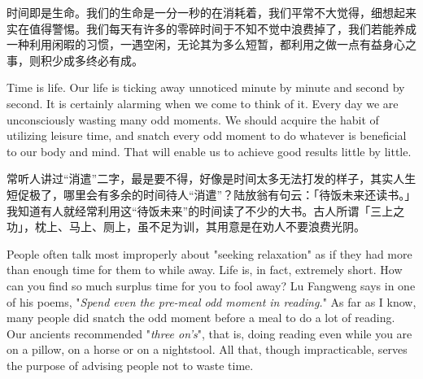 {%
% 
 
 时间即是生命。我们的生命是一分一秒的在消耗着，我们平常不大觉得，细想起来实在值得警惕。我们每天有许多的零碎时间于不知不觉中浪费掉了，我们若能养成一种利用闲暇的习惯，一遇空闲，无论其为多么短暂，都利用之做一点有益身心之事，则积少成多终必有成。
 
 Time is life. Our life is ticking away unnoticed minute by minute and second by second. It is certainly alarming when we come to think of it. Every day we are unconsciously wasting many odd moments. We should acquire the habit of utilizing leisure time, and snatch every odd moment to do whatever is beneficial to our body and mind. That will enable us to achieve good results little by little. 
 
 常听人讲过“消遣”二字，最是要不得，好像是时间太多无法打发的样子，其实人生短促极了，哪里会有多余的时间待人“消遣”？陆放翁有句云：「待饭未来还读书。」我知道有人就经常利用这“待饭未来”的时间读了不少的大书。古人所谓「三上之功」，枕上、马上、厕上，虽不足为训，其用意是在劝人不要浪费光阴。
 
 People often talk most improperly about "seeking relaxation" as if they had more than enough time for them to while away. Life is, in fact, extremely short. How can you find so much surplus time for you to fool away? Lu Fangweng says in one of his poems, "\textit{Spend even the pre-meal odd moment in reading.}" As far as I know, many people did snatch the odd moment before a meal to do a lot of reading. Our ancients recommended "\textit{three on's}", that is, doing reading even while you are on a pillow, on a horse or on a nightstool. All that, though impracticable, serves the purpose of advising people not to waste time.
 
}
